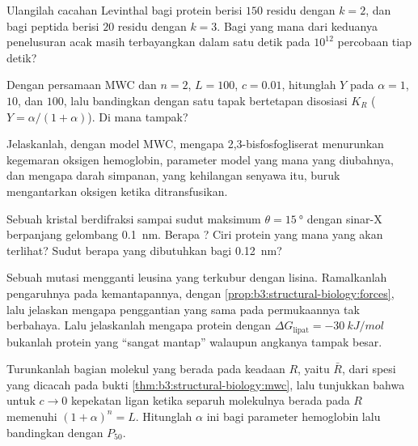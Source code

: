 \begin{exercise}[$\star\star$]\label{exo:b3:structural-biology:5}
Ulangilah cacahan Levinthal bagi protein berisi $150$ residu dengan $k = 2$,
dan bagi peptida berisi $20$ residu dengan $k = 3$. Bagi yang mana dari
keduanya penelusuran acak masih terbayangkan dalam satu detik pada $10^{12}$
percobaan tiap detik?
\end{exercise}

\begin{exercise}[$\star\star$]\label{exo:b3:structural-biology:6}
Dengan persamaan MWC dan $n = 2$, $L = 100$, $c = 0.01$, hitunglah
$Y$ pada $\alpha = 1$, $10$, dan $100$, lalu bandingkan dengan satu tapak
bertetapan disosiasi $K_{R}$ ($Y = \alpha/(1+\alpha)$). Di mana
 tampak?
\end{exercise}

\begin{exercise}[$\star\star$]\label{exo:b3:structural-biology:7}
Jelaskanlah, dengan model MWC, mengapa 2,3-bisfosfogliserat menurunkan
kegemaran oksigen hemoglobin, parameter model yang mana yang diubahnya, dan
mengapa darah simpanan, yang kehilangan senyawa itu, buruk mengantarkan
oksigen ketika ditransfusikan.
\end{exercise}

\begin{exercise}[$\star\star$]\label{exo:b3:structural-biology:8}
Sebuah kristal berdifraksi sampai sudut maksimum $\theta = \qty{15}{\degree}$
dengan sinar-X berpanjang gelombang \qty{0.1}{nm}. Berapa ? Ciri
protein yang mana yang akan terlihat? Sudut berapa yang dibutuhkan bagi
\qty{0.12}{nm}?
\end{exercise}

\begin{exercise}[$\star\star$]\label{exo:b3:structural-biology:9}
Sebuah mutasi mengganti leusina yang terkubur dengan lisina. Ramalkanlah
pengaruhnya pada kemantapannya, dengan \cref{prop:b3:structural-biology:forces},
lalu jelaskan mengapa penggantian yang sama pada permukaannya tak berbahaya.
Lalu jelaskanlah mengapa protein dengan $\Delta G_{\text{lipat}} =
\qty{-30}{kJ/mol}$ bukanlah protein yang ``sangat mantap'' walaupun angkanya
tampak besar.
\end{exercise}

\begin{exercise}[$\star\star\star$]\label{exo:b3:structural-biology:10}
Turunkanlah bagian molekul yang berada pada keadaan $R$, yaitu $\bar R$, dari
spesi yang dicacah pada bukti \cref{thm:b3:structural-biology:mwc},
lalu tunjukkan bahwa untuk $c \to 0$ kepekatan ligan ketika separuh
molekulnya berada pada $R$ memenuhi $(1+\alpha)^{n} = L$. Hitunglah
$\alpha$ ini bagi parameter hemoglobin lalu bandingkan dengan $P_{50}$.
\end{exercise}

